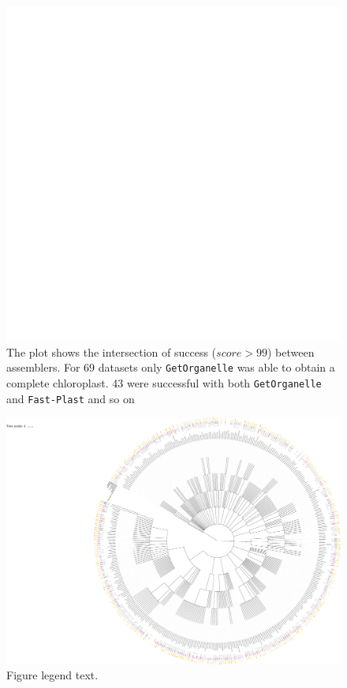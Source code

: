 \documentclass{bmcart}
\newcommand{\formatprogramnames}[1]{\texttt{#1}}
\newcommand{\fp}{\formatprogramnames{Fast-Plast}}
\newcommand{\go}{\formatprogramnames{GetOrganelle}}
\begin{document}
\begin{backmatter}
\begin{figure}[h!]
  \includegraphics[width=\textwidth,page=2]{plots/upset.pdf}
  \caption{
      The plot shows the intersection of success ($score > 99$) between assemblers. For \num{69} datasets only \go{} was able to obtain a complete chloroplast. \num{43} were successful with both \go{} and \fp{} and so on}
            \label{fig:upset}
      \end{figure}

\begin{figure}[h!]
  \includegraphics[width=\textwidth]{plots/real_datasets_tree.pdf}
  \caption{
      Figure legend text.}
      \label{fig:tree}
      \end{figure}


\end{backmatter}
\end{document}
